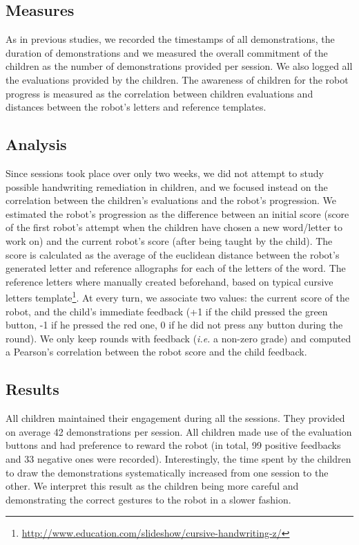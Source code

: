 \documentclass[conference]{IEEEtran}
\newcommand{\ie}{\textit{i.e.}\xspace}
\begin{document}
\subsection{Measures}

As in previous studies, we recorded the timestamps of all demonstrations, the duration of demonstrations and we measured the overall commitment of the children as the number of demonstrations provided per session. 
We also logged all the evaluations provided by the children. The awareness of children for the robot progress is measured as the correlation between children evaluations and distances between the robot's letters and reference templates.

\subsection{Analysis}

Since sessions took place over only two weeks, we did not attempt to study possible
handwriting remediation in children, and we focused instead on the correlation between the children's evaluations and the robot's progression.
We estimated the robot's progression as the difference between an initial score
(score of the first robot's attempt when the children have chosen a new word/letter to
work on) and the current robot's score (after being taught by the child). The
score is calculated as the average of the euclidean
distance between the robot's generated letter and reference allographs for each of the letters of the
word. The reference letters where manually created beforehand, based on typical cursive letters template\footnote{\url{http://www.education.com/slideshow/cursive-handwriting-z/}}. At every turn, we associate two values: the current score of the robot, and the child's immediate feedback (+1 if the child pressed the green button, -1 if he pressed the red one, 0 if he did not press any button during the round). We only keep rounds with feedback (\ie a non-zero grade) and computed a Pearson's correlation between the robot score and the child feedback.

\subsection{Results}

All children maintained their engagement during all the sessions. They provided
on average 42 demonstrations per session. All children made use of the evaluation buttons and
had preference to reward the robot (in total, 99 positive feedbacks and 33 negative ones were recorded). Interestingly, the time spent by the children to draw the demonstrations systematically increased from one session to the other. We interpret this result as the children being more careful and demonstrating the correct gestures to the robot in a slower fashion.
\end{document}
